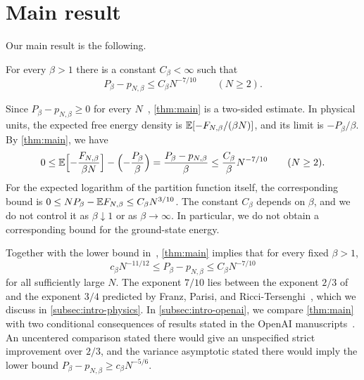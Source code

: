 \section{Main result}\label{sec:intro-results}

Our main result is the following.

\begin{theorem}\label{thm:main}
For every $\beta>1$ there is a constant $C_\beta<\infty$ such that
\[
 P_\beta-p_{N,\beta}\le C_\beta N^{-7/10}
 \qquad(N\ge2).
\]
\end{theorem}

Since $P_\beta-p_{N,\beta}\ge0$ for every $N$~\cite{Guerra2003},
\cref{thm:main} is a two-sided estimate. In physical units, the
expected free energy density is $\mathbb E[-F_{N,\beta}/(\beta N)]$, and its
limit is $-P_\beta/\beta$. By \cref{thm:main}, we have
\[
 0\le \mathbb E\Bigl[-\frac{F_{N,\beta}}{\beta N}\Bigr]
     -\Bigl(-\frac{P_\beta}{\beta}\Bigr)
 =\frac{P_\beta-p_{N,\beta}}{\beta}
 \le\frac{C_\beta}{\beta}N^{-7/10}
 \qquad(N\ge2).
\]
For the expected logarithm of the partition function itself, the
corresponding bound is $0\le NP_\beta-\mathbb E F_{N,\beta}\le C_\beta N^{3/10}$. The constant
$C_\beta$ depends on $\beta$, and we do not control it as
$\beta\downarrow1$ or as $\beta\to\infty$. In particular, we do not
obtain a corresponding bound for the ground-state energy.

Together with the lower bound in~\cite[Theorem~1.4]{AL},
\cref{thm:main} implies that for every fixed $\beta>1$,
\[
 c_\beta N^{-11/12}\le P_\beta-p_{N,\beta}\le C_\beta N^{-7/10}
\]
for all sufficiently large $N$. The exponent $7/10$ lies between the
exponent $2/3$ of~\cite[Theorem~1.4]{AL} and the exponent $3/4$
predicted by Franz, Parisi, and
Ricci-Tersenghi~\cite{FranzParisiRicciTersenghi2026}, which we discuss
in \cref{subsec:intro-physics}. In \cref{subsec:intro-openai}, we
compare \cref{thm:main} with two conditional consequences of results
stated in the OpenAI
manuscripts~\cite{OpenAIFluctuationScale,OpenAILimitingLaw}. An
uncentered comparison stated there would give an unspecified strict
improvement over $2/3$, and the variance asymptotic stated there would
imply the lower bound $P_\beta-p_{N,\beta}\ge c_\beta N^{-5/6}$.

